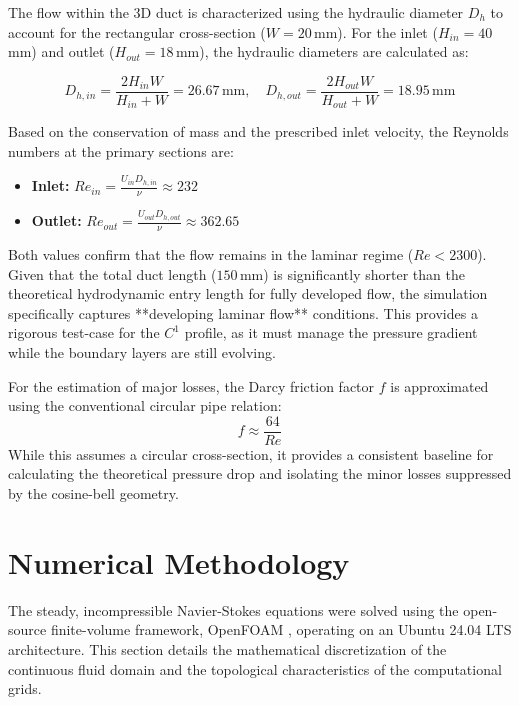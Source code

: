 \documentclass[12pt, a4paper]{article}
\begin{document}
The flow within the 3D duct is characterized using the hydraulic diameter $D_h$ to account for the rectangular cross-section ($W = 20$\,mm). For the inlet ($H_{in} = 40$\,mm) and outlet ($H_{out} = 18$\,mm), the hydraulic diameters are calculated as:

\begin{equation}
	D_{h,in} = \frac{2 H_{in} W}{H_{in} + W} = 26.67\,\text{mm}, \quad D_{h,out} = \frac{2 H_{out} W}{H_{out} + W} = 18.95\,\text{mm}
\end{equation}

Based on the conservation of mass and the prescribed inlet velocity, the Reynolds numbers at the primary sections are:
\begin{itemize}
	\item \textbf{Inlet:} $Re_{in} = \frac{U_{in} D_{h,in}}{\nu} \approx 232$
	\item \textbf{Outlet:} $Re_{out} = \frac{U_{out} D_{h,out}}{\nu} \approx 362.65$
\end{itemize}

Both values confirm that the flow remains in the laminar regime ($Re < 2300$). Given that the total duct length ($150\,\text{mm}$) is significantly shorter than the theoretical hydrodynamic entry length for fully developed flow, the simulation specifically captures **developing laminar flow** conditions. This provides a rigorous test-case for the $C^1$ profile, as it must manage the pressure gradient while the boundary layers are still evolving.

For the estimation of major losses, the Darcy friction factor $f$ is approximated using the conventional circular pipe relation:
\begin{equation}
	f \approx \frac{64}{Re}
\end{equation}
While this assumes a circular cross-section, it provides a consistent baseline for calculating the theoretical pressure drop and isolating the minor losses suppressed by the cosine-bell geometry.

\section{Numerical Methodology}

The steady, incompressible Navier-Stokes equations were solved using the open-source finite-volume framework, OpenFOAM \cite{openfoam2404}, operating on an Ubuntu 24.04 LTS architecture. This section details the mathematical discretization of the continuous fluid domain and the topological characteristics of the computational grids.
\end{document}

